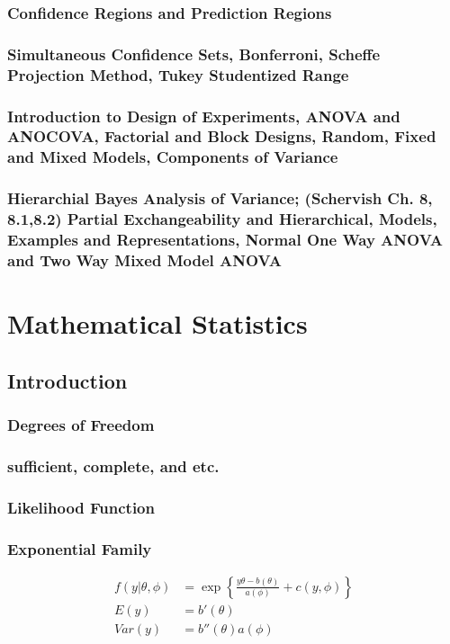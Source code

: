 \documentclass{memoir}
\begin{document}
\section{Confidence Regions and Prediction Regions}
\section{Simultaneous Confidence Sets, Bonferroni, Scheffe Projection Method, Tukey Studentized Range}
\section{Introduction to Design of Experiments, ANOVA and ANOCOVA, Factorial and Block Designs, Random, Fixed and Mixed Models, Components of Variance}
\section{Hierarchial Bayes Analysis of Variance; (Schervish Ch. 8, 8.1,8.2) Partial Exchangeability and Hierarchical, Models, Examples and Representations, Normal One Way ANOVA and Two Way Mixed Model ANOVA}

\part{Mathematical Statistics}
\chapter{Introduction}
\section{Degrees of Freedom}
\section{sufficient, complete, and etc.}
\section{Likelihood Function}
\section{Exponential Family}
\begin{align}
	f(y|\theta,\phi) & = \exp \left\{ \frac{y\theta-b(\theta)}{a(\phi)}+c(y,\phi) \right\} \\
	E(y) & = b'(\theta) \\
	Var(y) & = b''(\theta)a(\phi)
\end{align}
\end{document}
